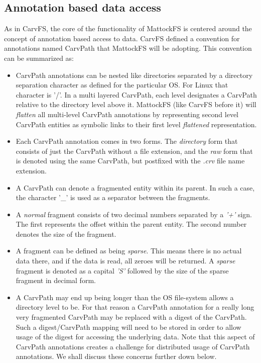 \subsection{Annotation based data access}
As in CarvFS, the core of the functionality of MattockFS is centered around the concept of annotation based access to data. CarvFS defined a convention for annotations named CarvPath that MattockFS will be adopting. This convention can be summarized as:
\begin{itemize}
\item CarvPath annotations can be nested like directories separated by a directory separation character as defined for the particular OS. For Linux that character is '/'. In a multi layered CarvPath, each level designates a CarvPath relative to the directory level above it. MattockFS (like CarvFS before it) will \emph{flatten} all multi-level CarvPath annotations by representing second level CarvPath entities as symbolic links to their first level \emph{flattened} representation.
\item Each CarvPath annotation comes in two forms. The \emph{directory} form that consists of just the CarvPath without a file extension, and the \emph{raw} form that is denoted using the same CarvPath, but postfixed with the \emph{.crv} file name extension.
\item A CarvPath can denote a fragmented entity within its parent. In such a case, the character '\_' is used as a separator between the fragments.
\item A \emph{normal} fragment consists of two decimal numbers separated by a \emph{'+'} sign. The first represents the offset within the parent entity. The second number denotes the size of the fragment.
\item A fragment can be defined as being \emph{sparse}. This means there is no actual data there, and if the data is read, all zeroes will be returned. A \emph{sparse} fragment is denoted as a capital \emph{'S'} followed by the size of the sparse fragment in decimal form.
\item A CarvPath may end up being longer than the OS file-system allows a directory level to be. For that reason a CarvPath annotation for a really long very fragmented CarvPath may be replaced with a digest of the CarvPath. Such a digest/CarvPath mapping will need to be stored in order to allow usage of the digest for accessing the underlying data. Note that this aspect of CarvPath annotations creates a challenge for distributed usage of CarvPath annotations. We shall discuss these concerns further down below.  
\end{itemize}
